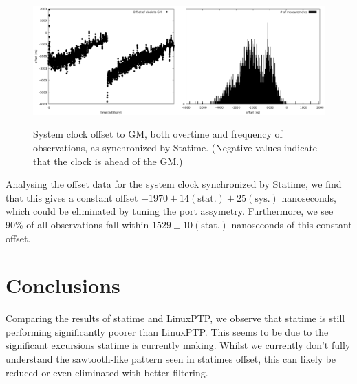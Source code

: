 \documentclass{article}
\begin{document}
\begin{figure}[h]
\includegraphics[width=0.5\textwidth]{gm_statime_offset_overtime.pdf}\includegraphics[width=0.5\textwidth]{gm_statime_offset.pdf}
\caption{System clock offset to GM, both overtime and frequency of observations, as synchronized by Statime. (Negative values indicate that the clock is ahead of the GM.)}
\label{fig:statime_sys_offset}
\end{figure}

Analysing the offset data for the system clock synchronized by Statime, we find that this gives a constant offset $-1970\pm 14(\text{stat.})\pm 25 (\text{sys.})$ nanoseconds, which could be eliminated by tuning the port assymetry. Furthermore, we see 90\% of all observations fall within $1529 \pm 10(\text{stat.})$ nanoseconds of this constant offset.

\section{Conclusions}

Comparing the results of statime and LinuxPTP, we observe that statime is still performing significantly poorer than LinuxPTP. This seems to be due to the significant excursions statime is currently making. Whilst we currently don't fully understand the sawtooth-like pattern seen in statimes offset, this can likely be reduced or even eliminated with better filtering.
\end{document}
